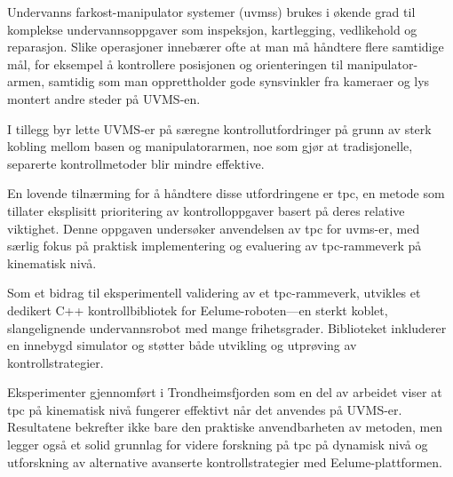 Undervanns farkost-manipulator systemer (\glspl{uvms}) brukes i økende grad til komplekse undervannsoppgaver som inspeksjon, kartlegging, vedlikehold og reparasjon. Slike operasjoner innebærer ofte at man må håndtere flere samtidige mål, for eksempel å kontrollere posisjonen og orienteringen til manipulator-armen, samtidig som man opprettholder gode synsvinkler fra kameraer og lys montert andre steder på UVMS-en.

I tillegg byr lette UVMS-er på særegne kontrollutfordringer på grunn av sterk kobling mellom basen og manipulatorarmen, noe som gjør at tradisjonelle, separerte kontrollmetoder blir mindre effektive.

En lovende tilnærming for å håndtere disse utfordringene er \gls{tpc}, en metode som tillater eksplisitt prioritering av kontrolloppgaver basert på deres relative viktighet. Denne oppgaven undersøker anvendelsen av \gls{tpc} for \gls{uvms}-er, med særlig fokus på praktisk implementering og evaluering av \gls{tpc}-rammeverk på kinematisk nivå.

Som et bidrag til eksperimentell validering av et \gls{tpc}-rammeverk, utvikles et dedikert C++ kontrollbibliotek for Eelume-roboten—en sterkt koblet, slangelignende undervannsrobot med mange frihetsgrader. Biblioteket inkluderer en innebygd simulator og støtter både utvikling og utprøving av kontrollstrategier.

Eksperimenter gjennomført i Trondheimsfjorden som en del av arbeidet viser at \gls{tpc} på kinematisk nivå fungerer effektivt når det anvendes på UVMS-er. Resultatene bekrefter ikke bare den praktiske anvendbarheten av metoden, men legger også et solid grunnlag for videre forskning på \gls{tpc} på dynamisk nivå og utforskning av alternative avanserte kontrollstrategier med Eelume-plattformen.

